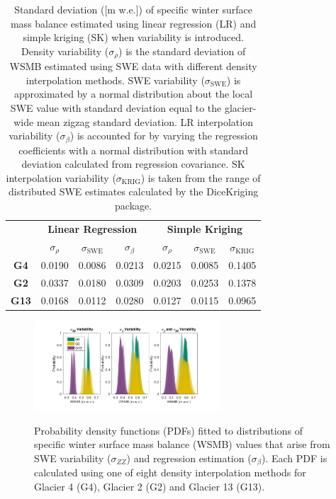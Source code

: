 \documentclass[twocolumn,letterpaper]{igs}
\begin{document}
 \begin{table}[]
\centering
\caption{Standard deviation ([m w.e.]) of specific winter surface mass balance estimated using linear regression (LR) and simple kriging (SK) when variability is introduced. Density variability ($\sigma_{\rho}$) is the standard deviation of WSMB estimated using SWE data with different density interpolation methods. SWE variability ($\sigma_{\mathrm{SWE}}$) is approximated by a normal distribution about the local SWE value with standard deviation equal to the glacier-wide mean zigzag standard deviation. LR interpolation variability ($\sigma_{\beta}$) is accounted for by varying the regression coefficients with a normal distribution with standard deviation calculated from regression covariance. SK interpolation variability ($\sigma_{\mathrm{KRIG}}$) is taken from the range of distributed SWE estimates calculated by the DiceKriging package.}
\label{tab:WSMBdistribution_sigma}
\begin{tabular}{ccccccc}
\textbf{} & \multicolumn{3}{c}{\textbf{Linear Regression}} & \multicolumn{3}{c}{\textbf{Simple Kriging}} \\
 & $\sigma_{\rho}$ & $\sigma_{\mathrm{SWE}}$ & $\sigma_{\beta}$ & $\sigma_{\rho}$ & $\sigma_{\mathrm{SWE}}$ & $\sigma_{\mathrm{KRIG}}$ \\
\midrule
\textbf{G4} & 0.0190 & 0.0086 & 0.0213 & 0.0215 & 0.0085 & 0.1405 \\
\textbf{G2} & 0.0337 & 0.0180 & 0.0309 & 0.0203 & 0.0253 & 0.1378 \\
\textbf{G13} & 0.0168 & 0.0112 & 0.0280 & 0.0127 & 0.0115 & 0.0965
\end{tabular}
\end{table}

\begin{figure}
	\centering
\hspace*{-1.2cm}
	\includegraphics[width =0.62\textwidth]{WSMBDist_LR.pdf}\\
	\caption{Probability density functions (PDFs) fitted to distributions of specific winter surface mass balance (WSMB) values that arise from SWE variability ($\sigma_{ZZ}$) and regression estimation ($\sigma_{\beta}$). Each PDF is calculated using one of eight density interpolation methods for Glacier 4 (G4), Glacier 2 (G2) and Glacier 13 (G13).}
	\label{fig:WSMBDist_LR}
\end{figure}
\end{document}
